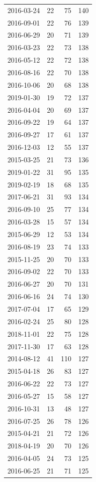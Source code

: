 \begin{tabular}{lrrr}
2016-03-24 & 22 & 75 & 140 \\
2016-09-01 & 22 & 76 & 139 \\
2016-06-29 & 20 & 71 & 139 \\
2016-03-23 & 22 & 73 & 138 \\
2016-05-12 & 22 & 72 & 138 \\
2016-08-16 & 22 & 70 & 138 \\
2016-10-06 & 20 & 68 & 138 \\
2019-01-30 & 19 & 72 & 137 \\
2016-04-04 & 20 & 69 & 137 \\
2016-09-22 & 19 & 64 & 137 \\
2016-09-27 & 17 & 61 & 137 \\
2016-12-03 & 12 & 55 & 137 \\
2015-03-25 & 21 & 73 & 136 \\
2019-01-22 & 31 & 95 & 135 \\
2019-02-19 & 18 & 68 & 135 \\
2017-06-21 & 31 & 93 & 134 \\
2016-09-10 & 25 & 77 & 134 \\
2016-03-28 & 15 & 57 & 134 \\
2015-06-29 & 12 & 53 & 134 \\
2016-08-19 & 23 & 74 & 133 \\
2015-11-25 & 20 & 70 & 133 \\
2016-09-02 & 22 & 70 & 133 \\
2016-06-27 & 20 & 70 & 131 \\
2016-06-16 & 24 & 74 & 130 \\
2017-07-04 & 17 & 65 & 129 \\
2016-02-24 & 25 & 80 & 128 \\
2018-11-01 & 22 & 75 & 128 \\
2017-11-30 & 17 & 63 & 128 \\
2014-08-12 & 41 & 110 & 127 \\
2015-04-18 & 26 & 83 & 127 \\
2016-06-22 & 22 & 73 & 127 \\
2016-05-27 & 15 & 58 & 127 \\
2016-10-31 & 13 & 48 & 127 \\
2016-07-25 & 26 & 78 & 126 \\
2015-04-21 & 21 & 72 & 126 \\
2018-04-19 & 20 & 70 & 126 \\
2016-04-05 & 24 & 73 & 125 \\
2016-06-25 & 21 & 71 & 125 \\

\end{tabular}
